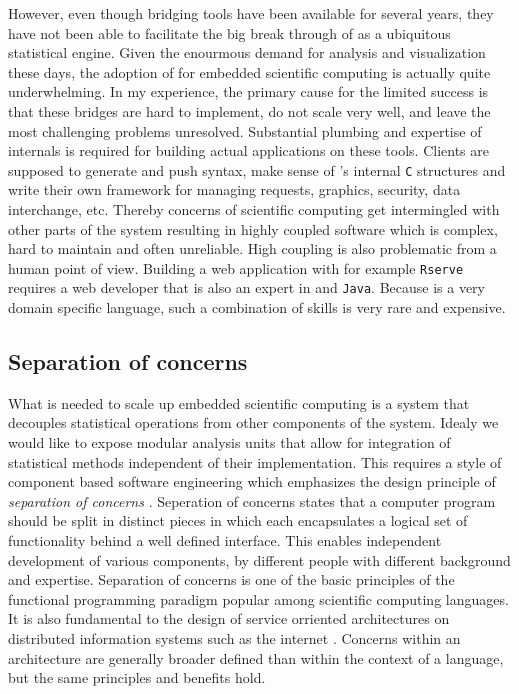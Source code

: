 However, even though bridging tools have been available for several years, they have not been able to facilitate the big break through of \R as a ubiquitous statistical engine. Given the enourmous demand for analysis and visualization these days, the adoption of \R for embedded scientific computing is actually quite underwhelming. In my experience, the primary cause for the limited success is that these bridges are hard to implement, do not scale very well, and leave the most challenging problems unresolved. Substantial plumbing and expertise of \R internals is required for building actual applications on these tools. Clients are supposed to generate and push \R syntax, make sense of \R's internal \texttt{C} structures and write their own framework for managing requests, graphics, security, data interchange, etc. Thereby concerns of scientific computing get intermingled with other parts of the system resulting in highly coupled software which is complex, hard to maintain and often unreliable. High coupling is also problematic from a human point of view. Building a web application with for example \texttt{Rserve} requires a web developer that is also an expert in \R and \texttt{Java}. Because \R is a very domain specific language, such a combination of skills is very rare and expensive. 


\subsection{Separation of concerns}

What is needed to scale up embedded scientific computing is a system that decouples statistical operations from other components of the system. 
Idealy we would like to expose modular analysis units that allow for integration of statistical methods independent of their implementation. This requires a style of component based software engineering which emphasizes the design principle of \emph{separation of concerns} \citep{heineman2001component}. Seperation of concerns states that a computer program should be split in distinct pieces in which each encapsulates a logical set of functionality behind a well defined interface. This enables independent development of various components, by different people with different background and expertise. Separation of concerns is one of the basic principles of the functional programming paradigm \citep{reade1989elements} popular among scientific computing languages. It is also fundamental to the design of service orriented architectures on distributed information systems such as the internet \citep{fielding2000architectural}. Concerns within an architecture are generally broader defined than within the context of a language, but the same principles and benefits hold. 

